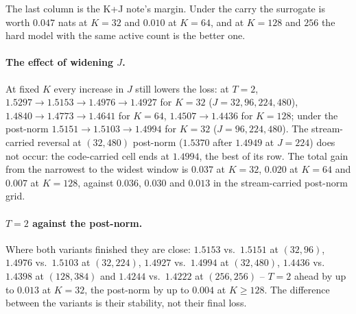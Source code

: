 \documentclass[11pt,a4paper]{article}
\begin{document}
The last column is the K+J note's margin. Under the carry the surrogate is
worth $0.047$ nats at $K=32$ and $0.010$ at $K=64$, and at $K = 128$ and
$256$ the hard model with the same active count is the better one.

\paragraph{The effect of widening $J$.}
At fixed $K$ every increase in $J$ still lowers the loss: at $T=2$,
$1.5297 \to 1.5153 \to 1.4976 \to 1.4927$ for $K=32$ ($J = 32, 96, 224,
480$), $1.4840 \to 1.4773 \to 1.4641$ for $K=64$, $1.4507 \to 1.4436$ for
$K=128$; under the post-norm $1.5151 \to 1.5103 \to 1.4994$ for $K=32$
($J = 96, 224, 480$). The stream-carried reversal at $(32, 480)$ post-norm
($1.5370$ after $1.4949$ at $J=224$) does not occur: the code-carried cell
ends at $1.4994$, the best of its row. The total gain from the narrowest to
the widest window is $0.037$ at $K=32$, $0.020$ at $K=64$ and $0.007$ at
$K=128$, against $0.036$, $0.030$ and $0.013$ in the stream-carried post-norm
grid.

\paragraph{$T=2$ against the post-norm.}
Where both variants finished they are close: $1.5153$ vs.\ $1.5151$ at
$(32,96)$, $1.4976$ vs.\ $1.5103$ at $(32,224)$, $1.4927$ vs.\ $1.4994$ at
$(32,480)$, $1.4436$ vs.\ $1.4398$ at $(128,384)$ and $1.4244$ vs.\ $1.4222$
at $(256,256)$ -- $T=2$ ahead by up to $0.013$ at $K=32$, the post-norm by up
to $0.004$ at $K \ge 128$. The difference between the variants is their
stability, not their final loss.
\end{document}
